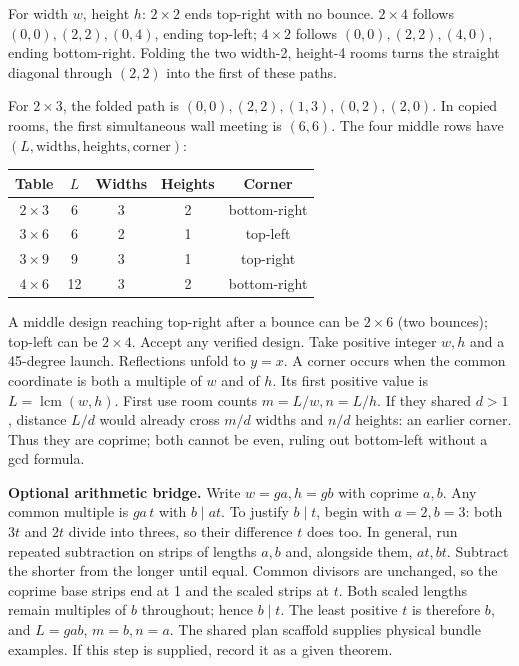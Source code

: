 \documentclass[11pt]{article}
\begin{document}
\newpage

For width $w$, height $h$: $2\times2$ ends top-right with no bounce. $2\times4$ follows $(0,0),(2,2),(0,4)$, ending top-left; $4\times2$ follows $(0,0),(2,2),(4,0)$, ending bottom-right. Folding the two width-2, height-4 rooms turns the straight diagonal through $(2,2)$ into the first of these paths.

For $2\times3$, the folded path is $(0,0),(2,2),(1,3),(0,2),(2,0)$. In copied rooms, the first simultaneous wall meeting is $(6,6)$. The four middle rows have $(L,\text{widths},\text{heights},\text{corner})$:
\begin{center}\renewcommand{\arraystretch}{1.35}\begin{tabular}{c|c|c|c|c}Table&$L$&Widths&Heights&Corner\\\hline$2\times3$&6&3&2&bottom-right\\$3\times6$&6&2&1&top-left\\$3\times9$&9&3&1&top-right\\$4\times6$&12&3&2&bottom-right\end{tabular}\end{center}
A middle design reaching top-right after a bounce can be $2\times6$ (two bounces); top-left can be $2\times4$. Accept any verified design.
Take positive integer $w,h$ and a 45-degree launch. Reflections unfold to $y=x$. A corner occurs when the common coordinate is both a multiple of $w$ and of $h$. Its first positive value is $L=\operatorname{lcm}(w,h)$. First use room counts $m=L/w,n=L/h$. If they shared $d>1$, distance $L/d$ would already cross $m/d$ widths and $n/d$ heights: an earlier corner. Thus they are coprime; both cannot be even, ruling out bottom-left without a gcd formula.

\textbf{Optional arithmetic bridge.} Write $w=ga,h=gb$ with coprime $a,b$. Any common multiple is $ga\,t$ with $b\mid at$. To justify $b\mid t$, begin with $a=2,b=3$: both $3t$ and $2t$ divide into threes, so their difference $t$ does too. In general, run repeated subtraction on strips of lengths $a,b$ and, alongside them, $at,bt$. Subtract the shorter from the longer until equal. Common divisors are unchanged, so the coprime base strips end at 1 and the scaled strips at $t$. Both scaled lengths remain multiples of $b$ throughout; hence $b\mid t$. The least positive $t$ is therefore $b$, and $L=gab$, $m=b,n=a$. The shared plan scaffold supplies physical bundle examples. If this step is supplied, record it as a given theorem.
\end{document}
